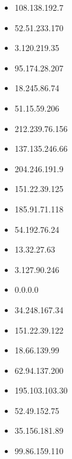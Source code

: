 \documentclass{article}
\begin{document}
\begin{itemize}
    
        \item 108.138.192.7
    
        \item 52.51.233.170
    
        \item 3.120.219.35
    
        \item 95.174.28.207
    
        \item 18.245.86.74
    
        \item 51.15.59.206
    
        \item 212.239.76.156
    
        \item 137.135.246.66
    
        \item 204.246.191.9
    
        \item 151.22.39.125
    
        \item 185.91.71.118
    
        \item 54.192.76.24
    
        \item 13.32.27.63
    
        \item 3.127.90.246
    
        \item 0.0.0.0
    
        \item 34.248.167.34
    
        \item 151.22.39.122
    
        \item 18.66.139.99
    
        \item 62.94.137.200
    
        \item 195.103.103.30
    
        \item 52.49.152.75
    
        \item 35.156.181.89
    
        \item 99.86.159.110
    

\end{itemize}
\end{document}
